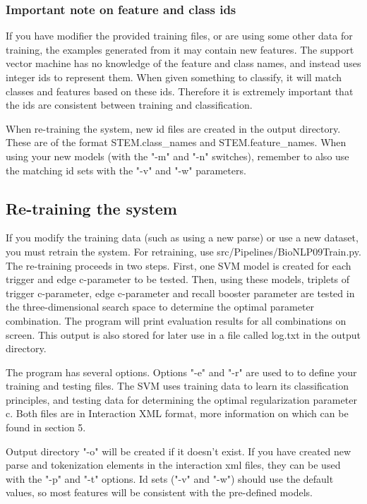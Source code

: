 \documentclass[a4paper,12pt]{article}
\begin{document}
\subsubsection{Important note on feature and class ids}

If you have modifier the provided training files, or are using some other data for training, the examples generated from it may contain new features. The support vector machine has no knowledge of the feature and class names, and instead uses integer ids to represent them. When given something to classify, it will match classes and features based on these ids. Therefore it is extremely important that the ids are consistent between training and classification.

When re-training the system, new id files are created in the output directory. These are of the format STEM.class\_names and STEM.feature\_names. When using your new models (with the "-m" and "-n" switches), remember to also use the matching id sets with the "-v" and "-w" parameters.

\subsection{Re-training the system}

If you modify the training data (such as using a new parse) or use a new dataset, you must retrain the system. For retraining, use src/Pipelines/BioNLP09Train.py. The re-training proceeds in two steps. First, one SVM model is created for each trigger and edge c-parameter to be tested. Then, using these models, triplets of trigger c-parameter, edge c-parameter and recall booster parameter are tested in the three-dimensional search space to determine the optimal parameter combination. The program will print evaluation results for all combinations on screen. This output is also stored for later use in a file called log.txt in the output directory.

The program has several options. Options "-e" and "-r" are used to to define your training and testing files. The SVM uses training data to learn its classification principles, and testing data for determining the optimal regularization parameter c. Both files are in Interaction XML format, more information on which can be found in section 5.

Output directory "-o" will be created if it doesn't exist. If you have created new parse and tokenization elements in the interaction xml files, they can be used with the "-p" and "-t" options. Id sets ("-v" and "-w") should use the default values, so most features will be consistent with the pre-defined models.
\end{document}
